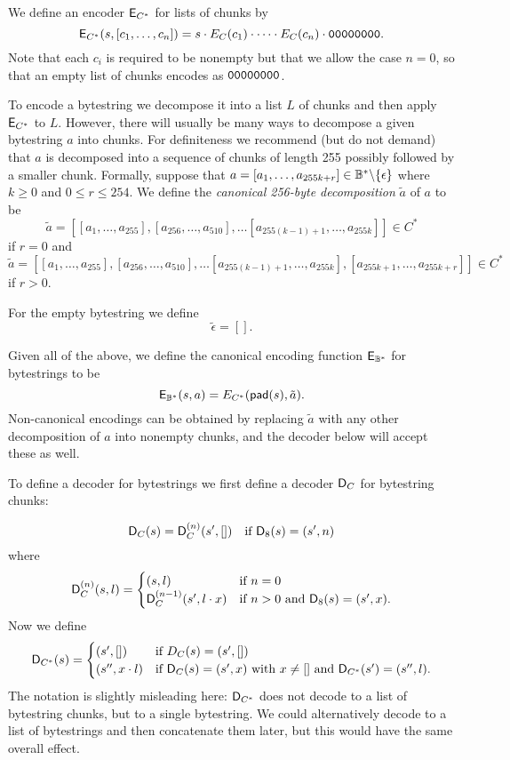 \noindent
We define an encoder $\mathsf{E}_{C^*}$ for lists of chunks by
$$
\mathsf{E}_{C^*} (s, [c_1, \ldots, c_n]) = s \cdot E_C(c_1) \cdot \cdots \cdot E_C(c_n) \cdot \mathtt{00000000}.
$$
\noindent Note that each $c_i$ is required to be nonempty but that we allow the
case $n = 0$, so that an empty list of chunks encodes as $\mathtt{00000000}$.

\medskip
\noindent To encode a bytestring we decompose it into a list $L$ of chunks and
then apply $\mathsf{E}_{C^*}$ to $L$.  However, there will usually be many ways to
decompose a given bytestring $a$ into chunks. For definiteness we recommend (but
do not demand) that $a$ is decomposed into a sequence of chunks of length 255
possibly followed by a smaller chunk.  Formally, suppose that $a = [a_1, \ldots,
  a_{255k+r}] \in \mathbb{B}^*\backslash\{\epsilon\}$ where $k \geq 0$ and $0 \leq r
\leq 254$.  We define the \textit{canonical 256-byte decomposition} $\tilde{a}$ of $a$ to
be
$$
\tilde{a} = [[a_1, \ldots, a_{255}],
  [a_{256}, \ldots, a_{510}],\ldots
  [a_{255(k-1)+1}, \ldots, a_{255k}]] \in C^*
$$
\noindent if $r=0$ and
$$
\tilde{a} = [[a_1, \ldots, a_{255}],
  [a_{256}, \ldots, a_{510}],\ldots
  [a_{255(k-1)+1}, \ldots, a_{255k}], [a_{255k+1}, \ldots, a_{255k+r}]] \in C^*
$$
\noindent if $r>0$.

\smallskip
\noindent For the empty bytestring we define
$$
\tilde{\epsilon} = [].
$$

\medskip
\noindent Given all of the above, we define the canonical encoding function
$\mathsf{E}_{\mathbb{B}^*}$ for bytestrings to be
$$
\mathsf{E}_{\mathbb{B}^*}(s, a) = E_{C^*}(\mathsf{pad}(s), \tilde{a}).
$$
\noindent Non-canonical encodings can be obtained by replacing $\tilde{a}$ with any
other decomposition of $a$ into nonempty chunks, and the decoder below will
accept these as well.

\bigskip

\noindent To define a decoder for bytestrings we first define a decoder
$\mathsf{D}_{C}$ for bytestring chunks:

$$
\mathsf{D}_{C}(s) = \mathsf{D}_C^{(n)}(s',[]) \quad \text{if $\mathsf{D}_8(s) = (s', n)$}
$$
where
$$
\mathsf{D}^{(n)}_C (s, l) =
\begin{cases}
  (s, l) & \text{if $n=0$}\\
  \mathsf{D}^{(n-1)}_C (s',l\cdot x)  & \text{if $n > 0$ and $\mathsf{D}_8(s) = (s',x)$.}
\end{cases}
$$
Now we define
$$
\mathsf{D}_{C^*}(s) =
\begin{cases}
  (s', []) & \text{if $D_C(s) = (s', [])$}\\
  (s'', x \cdot l) & \text{if $\mathsf{D}_C(s) = (s', x)$ with $x \ne []$ and $\mathsf{D}_{C^*}(s') = (s'', l)$}.
\end{cases}
$$
\noindent The notation is slightly misleading here: $\mathsf{D}_{C^*}$ does not
decode to a list of bytestring chunks, but to a single bytestring.  We
could alternatively decode to a list of bytestrings and then concatenate them
later, but this would have the same overall effect.

